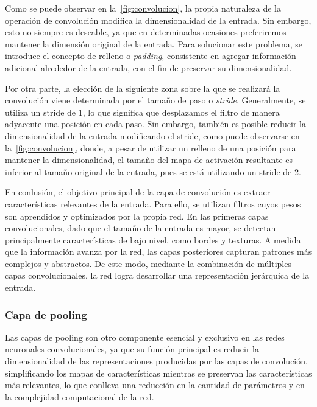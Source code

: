 Como se puede observar en la~\autoref{fig:convolucion}, la propia naturaleza de la operación de convolución modifica la dimensionalidad de la entrada. Sin embargo, esto no siempre es deseable, ya que en determinadas ocasiones preferiremos mantener la dimensión original de la entrada. Para solucionar este problema, se introduce el concepto de relleno o \emph{padding}, consistente en agregar información adicional alrededor de la entrada, con el fin de preservar su dimensionalidad.\newline

Por otra parte, la elección de la siguiente zona sobre la que se realizará la convolución viene determinada por el tamaño de paso o \emph{stride}. Generalmente, se utiliza un stride de 1, lo que significa que desplazamos el filtro de manera adyacente una posición en cada paso. Sin embargo, también es posible reducir la dimensionalidad de la entrada modificando el stride, como puede observarse en la~\autoref{fig:convolucion}, donde, a pesar de utilizar un relleno de una posición para mantener la dimensionalidad, el tamaño del mapa de activación resultante es inferior al tamaño original de la entrada, pues se está utilizando un stride de 2.\newline

En conlusión, el objetivo principal de la capa de convolución es extraer características relevantes de la entrada. Para ello, se utilizan filtros cuyos pesos son aprendidos y optimizados por la propia red. En las primeras capas convolucionales, dado que el tamaño de la entrada es mayor, se detectan principalmente características de bajo nivel, como bordes y texturas. A medida que la información avanza por la red, las capas posteriores capturan patrones más complejos y abstractos. De este modo, mediante la combinación de múltiples capas convolucionales, la red logra desarrollar una representación jerárquica de la entrada.\newline

\subsubsection{Capa de pooling}

Las capas de pooling son otro componente esencial y exclusivo en las redes neuronales convolucionales, ya que su función principal es reducir la dimensionalidad de las representaciones producidas por las capas de convolución, simplificando los mapas de características mientras se preservan las características más relevantes, lo que conlleva una reducción en la cantidad de parámetros y en la complejidad computacional de la red.\newline

